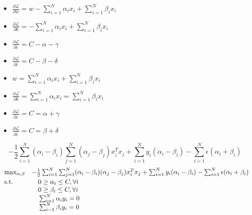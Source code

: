 \begin{itemize}
	\item $\frac{\partial\mathcal{L}}{\partial{w}} = w - \sum_{i = 1}^{N}\alpha_i x_i + \sum_{i = 1}^{N}\beta_ix_i$
	\item $\frac{\partial\mathcal{L}}{\partial{b}} = - \sum_{i = 1}^{N}\alpha_i x_i + \sum_{i = 1}^{N}\beta_ix_i$
	\item $\frac{\partial\mathcal{L}}{\partial{\varepsilon}} = C - \alpha - \gamma$ 
	\item $\frac{\partial\mathcal{L}}{\partial{\hat{\varepsilon}}} = C - \beta - \delta$ 
\end{itemize}
\begin{itemize}
	\item $ w = \sum_{i = 1}^{N}\alpha_i x_i + \sum_{i = 1}^{N}\beta_ix_i$
	\item $\frac{\partial\mathcal{L}}{\partial{b}} = \sum_{i = 1}^{N}\alpha_i x_i = \sum_{i = 1}^{N}\beta_ix_i$
	\item $\frac{\partial\mathcal{L}}{\partial{\varepsilon}} = C = \alpha + \gamma$ 
	\item $\frac{\partial\mathcal{L}}{\partial{\hat{\varepsilon}}} = C = \beta + \delta$ 
\end{itemize}
\begin{equation*}
-\frac{1}{2}\sum_{i = 1}^N(\alpha_i - \beta_i)\sum_{j = 1}^{N}(\alpha_j - \beta_j)x_i^Tx_j + \sum_{i = 1}^{N}y_i(\alpha_i - \beta_i) - \sum_{i = 1}^{N}\epsilon(\alpha_i + \beta_i)
\end{equation*}
\[
  \begin{array}{ll@{}r@{}l}
    	 \max_{\alpha, \beta}& -\frac{1}{2}\sum_{i = 1}^N\sum_{j = 1}^{N}(\alpha_i - \beta_i)(\alpha_j - \beta_j)x_i^Tx_j + \sum_{i = 1}^{N}y_i(\alpha_i - \beta_i) - \sum_{i = 1}^{N}\epsilon(\alpha_i + \beta_i)\\[\jot]
    	\text{s.t.}& \phantom{15}0 \geq \alpha_i \leq C, \forall i\\
    	& \phantom{15} 0 \geq \beta_i \leq C, \forall i\\
	& \phantom{15} \sum_{i = 1}^{N} \alpha_iy_i=  0 \\
	& \phantom{15}\sum_{i = 1}^{N} \beta_iy_i=  0\\
  \end{array}
\]